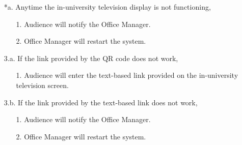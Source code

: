 \documentclass{article}
\begin{document}
    \begin{enumerate}
        \item[*a.] Anytime the in-university television display is not functioning,
        \begin{enumerate}
            \item[1.] Audience will notify the Office Manager.
            \item[2.] Office Manager will restart the system.
        \end{enumerate}
        \item [3.a.] If the link provided by the QR code does not work,
        \begin{enumerate}
            \item[1.] Audience will enter the text-based link provided on the in-university television screen. 
        \end{enumerate}
        \item[3.b.] If the link provided by the text-based link does not work,
        \begin{enumerate}
            \item[1.] Audience will notify the Office Manager.
            \item[2.] Office Manager will restart the system.
        \end{enumerate}
    \end{enumerate}
\end{document}
